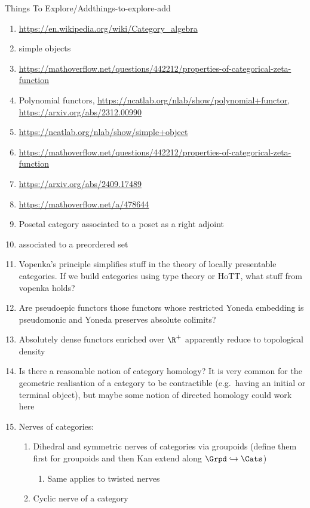 \begin{remark}{Things To Explore/Add}{things-to-explore-add}
\begin{enumerate}
        \item \url{https://en.wikipedia.org/wiki/Category_algebra}
        \item simple objects
        \item \url{https://mathoverflow.net/questions/442212/properties-of-categorical-zeta-function}
        \item Polynomial functors, \url{https://ncatlab.org/nlab/show/polynomial+functor}, \url{https://arxiv.org/abs/2312.00990}
        \item \url{https://ncatlab.org/nlab/show/simple+object}
        \item \url{https://mathoverflow.net/questions/442212/properties-of-categorical-zeta-function}
        \item \url{https://arxiv.org/abs/2409.17489}
        \item \url{https://mathoverflow.net/a/478644}
        \item Posetal category associated to a poset as a right adjoint
        \item {} associated to a preordered set
        \item Vopenka's principle simplifies stuff in the theory of locally presentable categories. If we build categories using type theory or HoTT, what stuff from vopenka holds?
        \item Are pseudoepic functors those functors whose restricted Yoneda embedding is pseudomonic and Yoneda preserves absolute colimits?
        \item Absolutely dense functors enriched over $\R^{+}$ apparently reduce to topological density
        \item Is there a reasonable notion of category homology? It is very common for the geometric realisation of a category to be contractible (e.g.\ having an initial or terminal object), but maybe some notion of directed homology could work here
        \item Nerves of categories:
            \begin{enumerate}
                \item Dihedral and symmetric nerves of categories via groupoids (define them first for groupoids and then Kan extend along $\Grpd\hookrightarrow\Cats$)
                    \begin{enumerate}
                        \item Same applies to twisted nerves
                    \end{enumerate}
                \item Cyclic nerve of a category

\end{enumerate}
\end{enumerate}
\end{remark}

